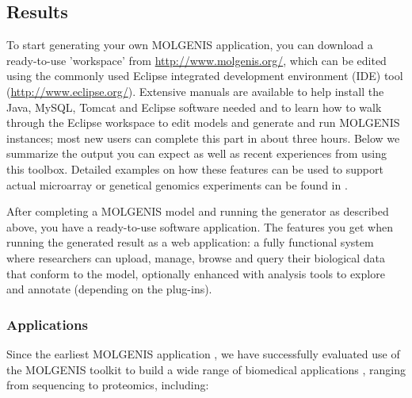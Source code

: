 \subsection{Results}
To start generating your own MOLGENIS application, you can download a ready-to-use 'workspace' 
from \url{http://www.molgenis.org/}, which can be edited using the commonly used Eclipse integrated 
development environment (IDE) tool (\url{http://www.eclipse.org/}). Extensive manuals are available to 
help install the Java, MySQL, Tomcat and Eclipse software needed and to learn how to walk through 
the Eclipse workspace to edit models and generate and run MOLGENIS instances; most new users can 
complete this part in about three hours. Below we summarize the output you can expect as well 
as recent experiences from using this toolbox. Detailed examples on how these features can be 
used to support actual microarray or genetical genomics experiments can be found in \cite{Swertz:2010a, Li:2009, Smedley:2008}.

After completing a MOLGENIS model and running the generator as described above, you have a 
ready-to-use software application. The features you get when running the generated result as 
a web application: a fully functional system where researchers can upload, manage, browse 
and query their biological data that conform to the model, optionally enhanced with analysis 
tools to explore and annotate (depending on the plug-ins).

\subsubsection{Applications}
Since the earliest MOLGENIS application \cite{Swertz:2004}, we have successfully evaluated use of the MOLGENIS 
toolkit to build a wide range of biomedical applications \cite{Swertz:2010a, Fredman:2002, Leu:2010, Li:2009, Smedley:2008}, 
ranging from sequencing to proteomics, including:

